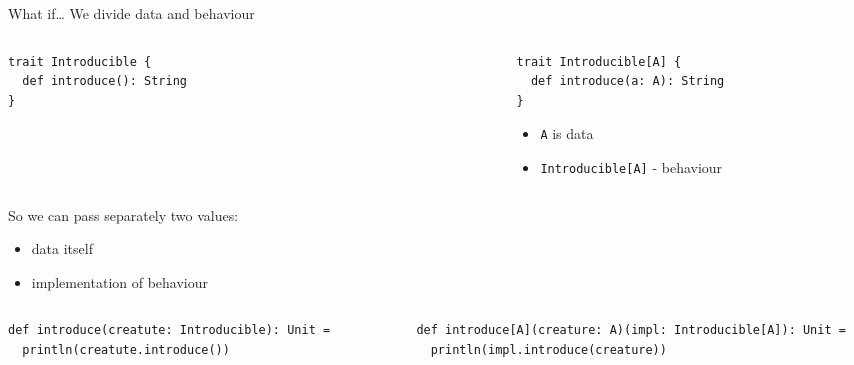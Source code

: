 \documentclass[presentation,aspectratio=169,smaller]{beamer}
\begin{document}
\begin{frame}[label={sec:org8699db2},fragile]{What if\ldots{}}
 We divide data and behaviour

\pause

\begin{columns}
\begin{column}[t]{0.42\columnwidth}
\begin{verbatim}
trait Introducible {
  def introduce(): String
}
\end{verbatim}
\end{column}

\begin{column}[t]{0.05\columnwidth}
\vspace*{0px}

{\large \Rightarrow}
\end{column}

\begin{column}[t]{0.55\columnwidth}
\begin{verbatim}
trait Introducible[A] {
  def introduce(a: A): String
}
\end{verbatim}

\begin{itemize}
\item \texttt{A} is data
\item \texttt{Introducible[A]} - behaviour
\end{itemize}
\end{column}
\end{columns}

\pause

\vspace*{1cm}

So we can pass separately two values:

\begin{itemize}
\item data itself
\item implementation of behaviour
\end{itemize}

\pause

\begin{columns}
\begin{column}[t]{0.42\columnwidth}
\begin{verbatim}
def introduce(creatute: Introducible): Unit =
  println(creatute.introduce())
\end{verbatim}
\end{column}

\begin{column}[t]{0.05\columnwidth}
\vspace*{0px}

{\large \Rightarrow}
\end{column}

\begin{column}[t]{0.55\columnwidth}
\begin{verbatim}
def introduce[A](creature: A)(impl: Introducible[A]): Unit =
  println(impl.introduce(creature))
\end{verbatim}
\end{column}
\end{columns}
\end{frame}
\end{document}
